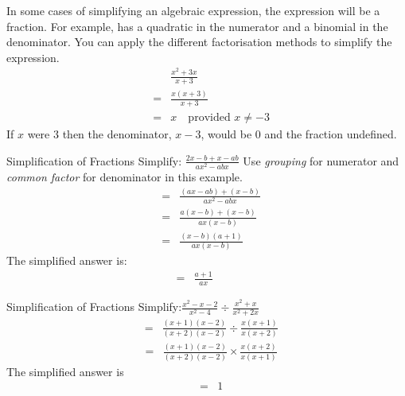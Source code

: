 \documentclass[10pt,a4paper,titlepage,twoside,openright]{report}
\begin{document}
In some cases of simplifying an algebraic expression, the expression will be a fraction. For example,
has a quadratic in the numerator and a binomial in the denominator. You can apply the different factorisation methods to simplify the expression.
\begin{eqnarray*}
&\ &\frac{x^2+3x}{x+3}\\
&=&\frac{x(x+3)}{x+3}\\
&=&x \quad\mbox{provided $x\ne-3$}
\end{eqnarray*}
If $x$ were $3$ then the denominator, $x-3$, would be $0$ and the fraction undefined.

\begin{wex}{Simplification of Fractions}
{Simplify: $\frac{2x-b+x-ab}{ax^2-abx}$}
 {
   Use \textit{grouping} for numerator and \textit{common factor} for denominator in this example.
  \begin{eqnarray*}
   &=&\frac{(ax-ab)+(x-b)}{ax^2-abx}\\
   &=&\frac{a(x-b)+(x-b)}{ax(x-b)}\\
   &=&\frac{(x-b)(a+1)}{ax(x-b)}
  \end{eqnarray*}
   The simplified answer is:
  \begin{eqnarray*}
   &=&\frac{a+1}{ax}\quad\quad\quad
  \end{eqnarray*}
 }
\end{wex}

\begin{wex}{Simplification of Fractions}
{Simplify:$\frac{x^2-x-2}{x^2-4}\div\frac{x^2+x}{x^2+2x}$}
 {
  \begin{eqnarray*}
   &=&\frac{(x+1)(x-2)}{(x+2)(x-2)}\div\frac{x(x+1)}{x(x+2)}
  \end{eqnarray*}
  \begin{eqnarray*}
  &=&\frac{(x+1)(x-2)}{(x+2)(x-2)}\times\frac{x(x+2)}{x(x+1)}
  \end{eqnarray*}
   The simplified answer is
  \begin{eqnarray*}
   &=&1
  \end{eqnarray*}
 }
\end{wex}
\end{document}
